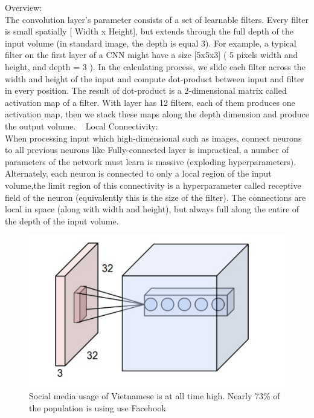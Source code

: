 Overview:\\ 
The convolution layer's parameter consists of a set of learnable filters. Every filter is small spatially [ Width x Height], but extends through the full depth of the input volume (in standard image, the depth is equal 3). For example, a typical filter on the first layer of a CNN might have a size [5x5x3] ( 5 pixels width and height, and depth = 3 ). In the calculating process, we slide each filter across the width and height of the input and compute dot-product between input and filter in every position. The result of dot-product is a 2-dimensional matrix called activation map of a filter. With layer has 12 filters, each of them produces one activation map, then we stack these maps along the depth dimension and produce the output volume.
 
Local Connectivity:\\
When processing input which high-dimensional such as images, connect neurons to all previous neurons like Fully-connected layer is impractical, a number of parameters of the network must learn is massive (exploding hyperparameters). Alternately, each neuron is connected to only a local region of the input volume,the limit region of this connectivity is a hyperparameter called receptive field of the neuron (equivalently this is the size of the filter). The connections are local in space (along with width and height), but always full along the entire of the depth of the input volume.
\begin{center}
  \begin{figure}[H]
  \centering
  \includegraphics[width=1\columnwidth]{images/chap2/LocalConnectivity.png}
  \caption{Social media usage of Vietnamese is at all time high. Nearly 73\% of the population is using use Facebook}
  \label{chap2:LocalConnectivity}
  \end{figure}
\end{center}

